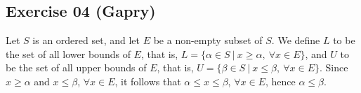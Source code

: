 \subsection*{Exercise 04 (Gapry)}
Let $S$ is an ordered set, and let $E$ be a non-empty subset of $S$.
We define $L$ to be the set of all lower bounds of $E$, that is, $L = \{\alpha \in S\ |\ x \ge \alpha,\ \forall x \in E\}$, and $U$ to be the set of all upper bounds of $E$, that is, $U = \{\beta \in S\ |\ x \le \beta,\ \forall x \in E\}$. Since $x \ge \alpha$ and $x \le \beta$, $\forall x \in E$, it follows that $\alpha \le x \le \beta$, $\forall x \in E$, hence $\alpha \le \beta$.